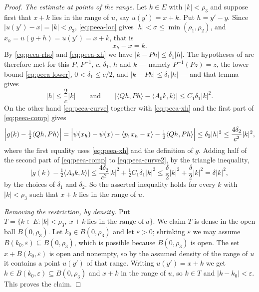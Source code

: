 \begin{proof}
\emph{The estimate at points of the range.}
Let $k\in E$ with $|k|<\rho_3$ and suppose first that $x+k$ lies in the range of
$u$, say $u(y')=x+k$. Put $h=y'-y$. Since $|u(y')-x|=|k|<\rho_3$,
\eqref{eq:peea-loc} gives $|h|<\sigma\le\min(\rho_1,\rho_2)$, and
$x_h=u(y+h)=u(y')=x+k$, that is
\begin{equation}\label{eq:peea-xh}
  x_h-x=k .
\end{equation}
By \eqref{eq:peea-rho} and \eqref{eq:peea-xh} we have $|k-Ph|\le\delta_1|h|$.
The hypotheses of  are therefore met for
this $P$, $P^{-1}$, $c$, $\delta_1$, $h$ and $k$ --- namely $P^{-1}(Pz)=z$,
the lower bound \eqref{eq:peea-lower}, $0<\delta_1\le c/2$, and
$|k-Ph|\le\delta_1|h|$ --- and that lemma gives
\begin{equation}\label{eq:peea-comp}
  |h|\le\frac{2}{c}|k|
  \qquad\text{and}\qquad
  \bigl|\langle Qh,Ph\rangle-\langle A_0k,k\rangle\bigr|\le C_1\delta_1|k|^2 .
\end{equation}
On the other hand \eqref{eq:peea-curve} together with \eqref{eq:peea-xh} and the
first part of \eqref{eq:peea-comp} gives
\begin{equation}\label{eq:peea-curve2}
  \Bigl|g(k)-\tfrac12\langle Qh,Ph\rangle\Bigr|
   =\Bigl|\psi(x_h)-\psi(x)-\langle p,x_h-x\rangle
     -\tfrac12\langle Qh,Ph\rangle\Bigr|
   \le\delta_2|h|^2\le\frac{4\delta_2}{c^2}|k|^2 ,
\end{equation}
where the first equality uses \eqref{eq:peea-xh} and the definition of $g$.
Adding half of the second part of \eqref{eq:peea-comp} to
\eqref{eq:peea-curve2}, by the triangle inequality,
\begin{equation}\label{eq:peea-dense}
  \bigl|g(k)-\tfrac12\langle A_0k,k\rangle\bigr|
   \le\frac{4\delta_2}{c^2}|k|^2+\tfrac12C_1\delta_1|k|^2
   \le\frac{\delta}{2}|k|^2+\frac{\delta}{2}|k|^2=\delta|k|^2 ,
\end{equation}
by the choices of $\delta_1$ and $\delta_2$. So the asserted inequality holds for
every $k$ with $|k|<\rho_3$ such that $x+k$ lies in the range of $u$.

\emph{Removing the restriction, by density.}
Put $T=\{k\in E:|k|<\rho_3,\ x+k\ \text{lies in the range of}\ u\}$. We claim
$T$ is dense in the open ball $B(0,\rho_3)$. Let $k_0\in B(0,\rho_3)$ and let
$\varepsilon>0$; shrinking $\varepsilon$ we may assume
$B(k_0,\varepsilon)\subseteq B(0,\rho_3)$, which is possible because
$B(0,\rho_3)$ is open. The set $x+B(k_0,\varepsilon)$ is open and nonempty, so
by the assumed density of the range of $u$ it contains a point $u(y')$ of that
range. Writing $u(y')=x+k$ we get $k\in B(k_0,\varepsilon)\subseteq B(0,\rho_3)$
and $x+k$ in the range of $u$, so $k\in T$ and $|k-k_0|<\varepsilon$. This
proves the claim.


\end{proof}
